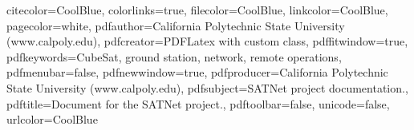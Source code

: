 
\renewcommand{\headrulewidth}{0pt}
\renewcommand{\footrulewidth}{0pt}
\addtolength{\headheight}{0.5pt}

{
    \fancyhead{}
    \renewcommand{\headrulewidth}{0pt}
}

\sectionfont{\rmfamily}
\subsectionfont{\rmfamily}
\subsubsectionfont{\rmfamily}
\paragraphfont{\rmfamily}
\subparagraphfont{\rmfamily}

\newcommand*{\newblankpage}
{
    \newpage
    \thispagestyle{empty}
}

\hypersetup
{
	citecolor=CoolBlue,
	colorlinks=true,
	filecolor=CoolBlue,
	linkcolor=CoolBlue,
	pagecolor=white,
	pdfauthor={California Polytechnic State University (www.calpoly.edu)},
	pdfcreator={PDFLatex with custom class},
	pdffitwindow=true,
	pdfkeywords={CubeSat, ground station, network, remote operations},
	pdfmenubar=false,
	pdfnewwindow=true,
	pdfproducer={California Polytechnic State University (www.calpoly.edu)},
	pdfsubject={SATNet project documentation.},
	pdftitle={Document for the SATNet project.},
	pdftoolbar=false,
	unicode=false,
	urlcolor=CoolBlue
}

\newcommand{\note}[1]
{
    \marginpar
    {
	\setArialFont
	\rule{\marginparwidth}{5pt}
	\vspace{3pt}
	\parbox{\marginparwidth}{\scriptsize#1}
	\vspace{3pt}
	\rule{\marginparwidth}{5pt}
    }
}

\newcommand{\breaklongtable}[1]
{
	\multicolumn{#1}{c}
	    {\scriptsize\itshape
		(Continues on next page) $\Longrightarrow$}\\
	\pagebreak
	\multicolumn{#1}{c}
	    {\scriptsize\itshape
		$\Longleftarrow$ (Comes from previous page)}\\
}

